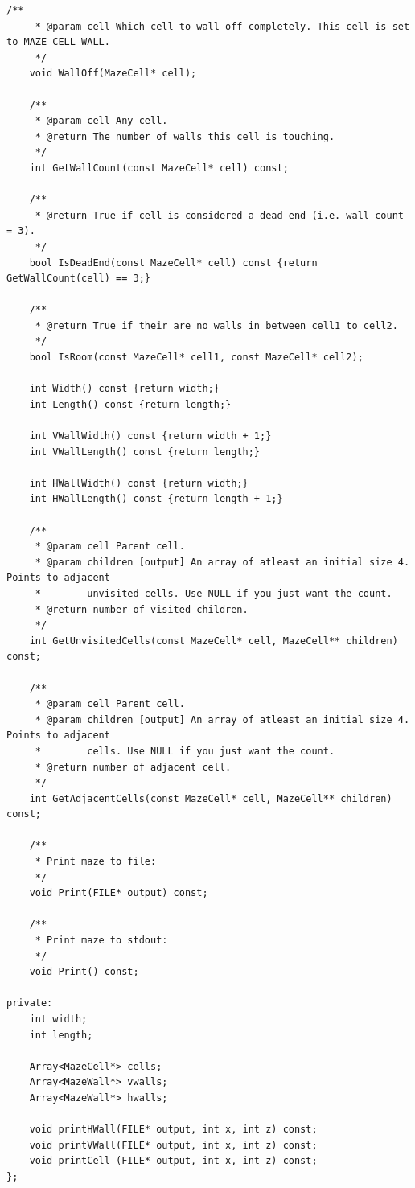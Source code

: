 \begin{lstlisting}[caption= The \texttt{Maze} class]
    /**
     * @param cell Which cell to wall off completely. This cell is set to MAZE_CELL_WALL.
     */
    void WallOff(MazeCell* cell);
    
    /**
     * @param cell Any cell.
     * @return The number of walls this cell is touching.
     */
    int GetWallCount(const MazeCell* cell) const;
    
    /**
     * @return True if cell is considered a dead-end (i.e. wall count = 3).
     */
    bool IsDeadEnd(const MazeCell* cell) const {return GetWallCount(cell) == 3;}
    
    /**
     * @return True if their are no walls in between cell1 to cell2.
     */
    bool IsRoom(const MazeCell* cell1, const MazeCell* cell2);
    
    int Width() const {return width;}
    int Length() const {return length;}
    
    int VWallWidth() const {return width + 1;}
    int VWallLength() const {return length;}
    
    int HWallWidth() const {return width;}
    int HWallLength() const {return length + 1;}
    
    /**
     * @param cell Parent cell.
     * @param children [output] An array of atleast an initial size 4. Points to adjacent
     *        unvisited cells. Use NULL if you just want the count.
     * @return number of visited children.
     */
    int GetUnvisitedCells(const MazeCell* cell, MazeCell** children) const;
    
    /**
     * @param cell Parent cell.
     * @param children [output] An array of atleast an initial size 4. Points to adjacent
     *        cells. Use NULL if you just want the count.
     * @return number of adjacent cell.
     */
    int GetAdjacentCells(const MazeCell* cell, MazeCell** children) const;
    
    /**
     * Print maze to file:
     */
    void Print(FILE* output) const;
    
    /**
     * Print maze to stdout:
     */
    void Print() const;
    
private:
    int width;
    int length;
    
    Array<MazeCell*> cells;
    Array<MazeWall*> vwalls;
    Array<MazeWall*> hwalls;
    
    void printHWall(FILE* output, int x, int z) const;
    void printVWall(FILE* output, int x, int z) const;
    void printCell (FILE* output, int x, int z) const;
};

\end{lstlisting}

